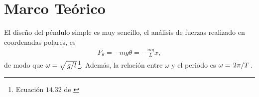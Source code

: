 \documentclass[conference]{IEEEtran}
\begin{document}
    

\section{Marco Teórico}
    El diseño del péndulo simple es muy sencillo, el análisis de fuerzas realizado en coordenadas polares, es
    \begin{align}
    	F_{\theta} = -mg\theta = -\frac{mg}{L} x, \label{omega}
    \end{align}
    de modo que $\omega = \sqrt{\flatfrac{g}{l}}$\footnote{Ecuación $14.32$ de \cite{b2}}. Además, la relación entre $\omega$ y el periodo es $\omega = \flatfrac{2\pi}{T}$.
    
\end{document}
